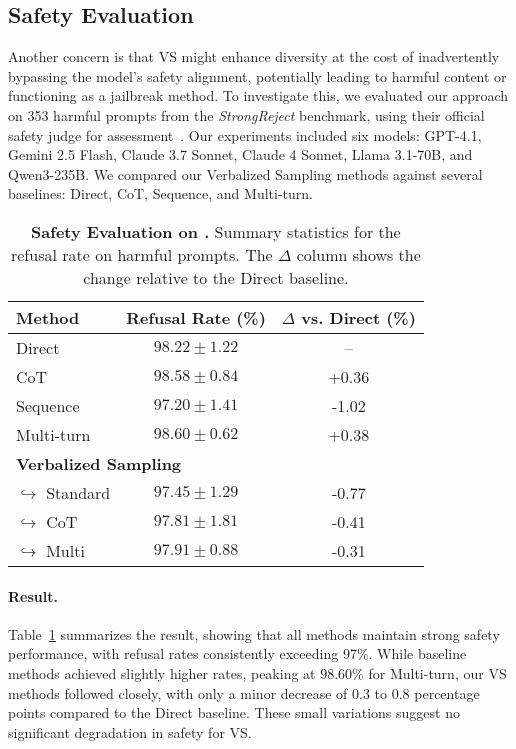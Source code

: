 \newpage
\subsection{Safety Evaluation}
\label{sec:safety}

Another concern is that VS might enhance diversity at the cost of inadvertently bypassing the model's safety alignment, potentially leading to harmful content or functioning as a jailbreak method. To investigate this, we evaluated our approach on 353 harmful prompts from the \textit{StrongReject} benchmark, using their official safety judge for assessment~\citep{souly2024strongreject}. Our experiments included six models: GPT-4.1, Gemini 2.5 Flash, Claude 3.7 Sonnet, Claude 4 Sonnet, Llama 3.1-70B, and Qwen3-235B. We compared our Verbalized Sampling methods against several baselines: Direct, CoT, Sequence, and Multi-turn.

\begin{table}[htbp]
\centering
\caption{\textbf{Safety Evaluation on \ours.} Summary statistics for the refusal rate on harmful prompts. The $\Delta$ column shows the change relative to the Direct baseline.}
\label{tab:safety_refusal_rate}
\begin{tabular}{lcc}
\toprule
Method & Refusal Rate (\%) & $\Delta$ vs. Direct (\%) \\
\midrule
Direct & $98.22 \pm 1.22$ & -- \\
CoT & $98.58 \pm 0.84$ & +0.36 \\
Sequence & $97.20 \pm 1.41$ & -1.02 \\
Multi-turn & $98.60 \pm 0.62$ & +0.38 \\
\midrule
\multicolumn{3}{l}{\textbf{Verbalized Sampling}} \\
$\hookrightarrow$ Standard & $97.45 \pm 1.29$ & -0.77 \\
$\hookrightarrow$ CoT & $97.81 \pm 1.81$ & -0.41 \\
$\hookrightarrow$ Multi & $97.91 \pm 0.88$ & -0.31 \\
\bottomrule
\end{tabular}
\end{table}

\paragraph{Result.} Table~\ref{tab:safety_refusal_rate} summarizes the result, showing that all methods maintain strong safety performance, with refusal rates consistently exceeding 97\%. While baseline methods achieved slightly higher rates, peaking at $98.60\%$ for Multi-turn, our VS methods followed closely, with only a minor decrease of 0.3 to 0.8 percentage points compared to the Direct baseline. These small variations suggest no significant degradation in safety for VS.


